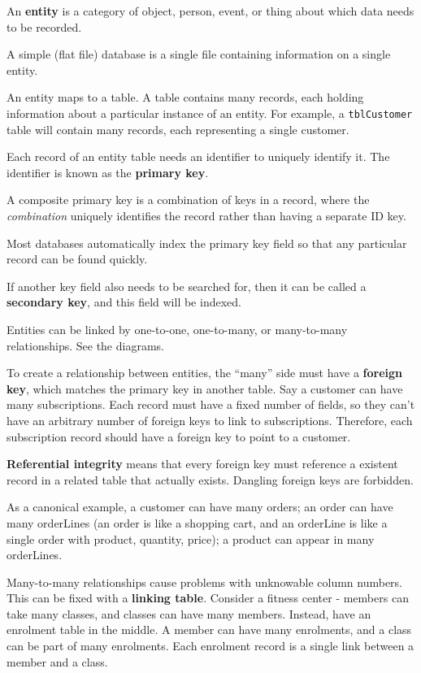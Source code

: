 \documentclass[../main.tex]{subfile}
\begin{document}

An \textbf{entity} is a category of object, person, event, or thing about which data needs to be recorded.

A simple (flat file) database is a single file containing information on a single entity.

An entity maps to a table. A table contains many records, each holding information about a particular instance of an entity. For example, a \texttt{tblCustomer} table will contain many records, each representing a single customer.

Each record of an entity table needs an identifier to uniquely identify it. The identifier is known as the \textbf{primary key}.

A composite primary key is a combination of keys in a record, where the \textit{combination} uniquely identifies the record rather than having a separate ID key.

Most databases automatically index the primary key field so that any particular record can be found quickly.

If another key field also needs to be searched for, then it can be called a \textbf{secondary key}, and this field will be indexed.

Entities can be linked by one-to-one, one-to-many, or many-to-many relationships. See the diagrams.

To create a relationship between entities, the \enquote{many} side must have a \textbf{foreign key}, which matches the primary key in another table. Say a customer can have many subscriptions. Each record must have a fixed number of fields, so they can't have an arbitrary number of foreign keys to link to subscriptions. Therefore, each subscription record should have a foreign key to point to a customer.

\textbf{Referential integrity} means that every foreign key must reference a existent record in a related table that actually exists. Dangling foreign keys are forbidden.

As a canonical example, a customer can have many orders; an order can have many orderLines (an order is like a shopping cart, and an orderLine is like a single order with product, quantity, price); a product can appear in many orderLines.

Many-to-many relationships cause problems with unknowable column numbers. This can be fixed with a \textbf{linking table}. Consider a fitness center - members can take many classes, and classes can have many members. Instead, have an enrolment table in the middle. A member can have many enrolments, and a class can be part of many enrolments. Each enrolment record is a single link between a member and a class.
\end{document}
